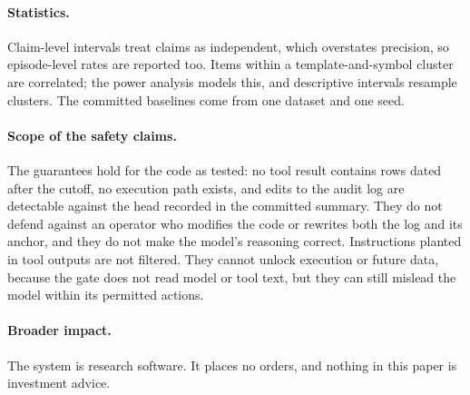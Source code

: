 \paragraph{Statistics.} Claim-level intervals treat claims as independent,
which overstates precision, so episode-level rates are reported too. Items
within a template-and-symbol cluster are correlated; the power analysis
models this, and descriptive intervals resample clusters. The committed
baselines come from one dataset and one seed.

\paragraph{Scope of the safety claims.} The guarantees hold for the code as
tested: no tool result contains rows dated after the cutoff, no execution path
exists, and edits to the audit log are detectable against the head recorded
in the committed summary. They do not defend against an operator who modifies
the code or rewrites both the log and its anchor, and they do not make the
model's reasoning correct. Instructions planted in tool outputs are not
filtered. They cannot unlock execution or future data, because the gate does
not read model or tool text, but they can still mislead the model within its
permitted actions.

\paragraph{Broader impact.} The system is research software. It places no
orders, and nothing in this paper is investment advice.
